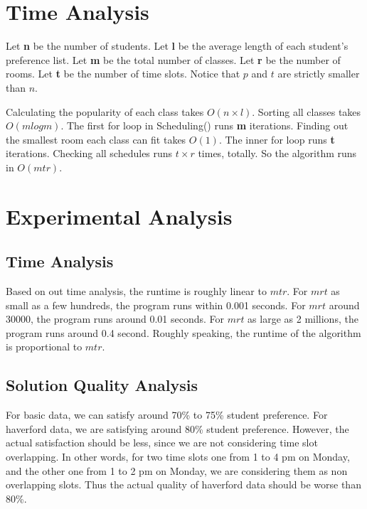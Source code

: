 \documentclass[11pt, oneside]{article}   	%
\begin{document}
\begin{algorithm}[H]

\end{algorithm}
\section{Time Analysis}
Let \textbf{n} be the number of students. 
Let \textbf{l} be the average length of each student's preference list.
Let \textbf{m} be the total number of classes. 
Let \textbf{r} be the number of rooms. 
Let \textbf{t} be the number of time slots. 
Notice that $p$ and $t$ are strictly smaller than $n$.

Calculating the popularity of each class takes $O(n\times l)$. Sorting all classes takes $O(mlogm)$. The first for loop in Scheduling() runs \textbf{m} iterations. Finding out the smallest room each class can fit takes $O(1)$. The inner for loop runs \textbf{t} iterations. Checking all schedules runs $t \times r$ times, totally. So the algorithm runs in $O(mtr)$.

\section{Experimental Analysis}
\subsection{Time Analysis}
Based on out time analysis, the runtime is roughly linear to $mtr$. For $mrt$ as small as a few hundreds, the program runs within 0.001 seconds. For $mrt$ around 30000, the program runs around 0.01 seconds. For $mrt$ as large as 2 millions, the program runs around 0.4 second. Roughly speaking, the runtime of the algorithm is proportional to $mtr$. 

\subsection{Solution Quality Analysis}
For basic data, we can satisfy around 70\% to 75\% student preference. For haverford data, we are satisfying around 80\% student preference. However, the actual satisfaction should be less, since we are not considering time slot overlapping. In other words, for two time slots one from 1 to 4 pm on Monday, and the other one from 1 to 2 pm on Monday, we are considering them as non overlapping slots. Thus the actual quality of haverford data should be worse than 80\%.
\end{document}
